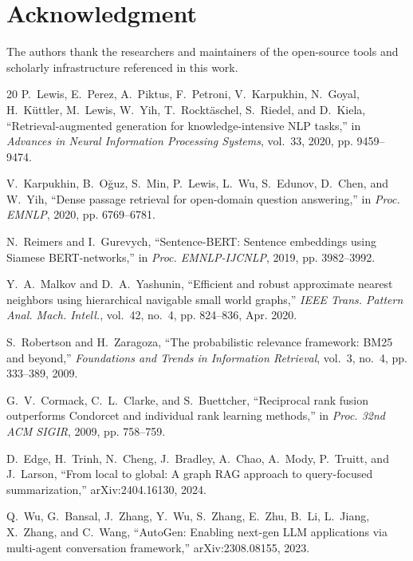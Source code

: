 \documentclass[conference]{IEEEtran}
\begin{document}
\section*{Acknowledgment}
The authors thank the researchers and maintainers of the open-source tools and scholarly infrastructure referenced in this work.

\begin{thebibliography}{20}
P.~Lewis, E.~Perez, A.~Piktus, F.~Petroni, V.~Karpukhin, N.~Goyal, H.~K\"uttler, M.~Lewis, W.~Yih, T.~Rockt\"aschel, S.~Riedel, and D.~Kiela, ``Retrieval-augmented generation for knowledge-intensive NLP tasks,'' in \textit{Advances in Neural Information Processing Systems}, vol.~33, 2020, pp. 9459--9474.

V.~Karpukhin, B.~O\u{g}uz, S.~Min, P.~Lewis, L.~Wu, S.~Edunov, D.~Chen, and W.~Yih, ``Dense passage retrieval for open-domain question answering,'' in \textit{Proc. EMNLP}, 2020, pp. 6769--6781.

N.~Reimers and I.~Gurevych, ``Sentence-BERT: Sentence embeddings using Siamese BERT-networks,'' in \textit{Proc. EMNLP-IJCNLP}, 2019, pp. 3982--3992.

Y.~A.~Malkov and D.~A.~Yashunin, ``Efficient and robust approximate nearest neighbors using hierarchical navigable small world graphs,'' \textit{IEEE Trans. Pattern Anal. Mach. Intell.}, vol.~42, no.~4, pp. 824--836, Apr. 2020.

S.~Robertson and H.~Zaragoza, ``The probabilistic relevance framework: BM25 and beyond,'' \textit{Foundations and Trends in Information Retrieval}, vol.~3, no.~4, pp. 333--389, 2009.

G.~V.~Cormack, C.~L.~Clarke, and S.~Buettcher, ``Reciprocal rank fusion outperforms Condorcet and individual rank learning methods,'' in \textit{Proc. 32nd ACM SIGIR}, 2009, pp. 758--759.

D.~Edge, H.~Trinh, N.~Cheng, J.~Bradley, A.~Chao, A.~Mody, P.~Truitt, and J.~Larson, ``From local to global: A graph RAG approach to query-focused summarization,'' arXiv:2404.16130, 2024.

Q.~Wu, G.~Bansal, J.~Zhang, Y.~Wu, S.~Zhang, E.~Zhu, B.~Li, L.~Jiang, X.~Zhang, and C.~Wang, ``AutoGen: Enabling next-gen LLM applications via multi-agent conversation framework,'' arXiv:2308.08155, 2023.


\end{thebibliography}
\end{document}
